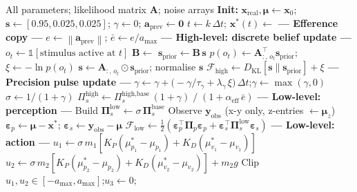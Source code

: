 \documentclass[11pt, a4paper]{article}
\newcommand{\vect}[1]{\bm{#1}}
\newcommand{\mat}[1]{\mathbf{#1}}
\newcommand{\FE}{\mathcal{F}}
\newcommand{\norm}[1]{\left\|#1\right\|}
\newcommand{\Pip}{\mat{\Pi}_p}
\newcommand{\Pisl}{\mat{\Pi}_s^{\text{low}}}
\newcommand{\Pish}{\Pi_s^{\text{high}}}
\newcommand{\epsp}{\vect{\varepsilon}_p}
\newcommand{\epss}{\vect{\varepsilon}_s}
\begin{document}
\begin{algorithm}[H]
\caption{Hierarchical AIF — Two-Tier Simulation Loop}
\label{alg:haif}
\begin{algorithmic}[1]
\Require All parameters; likelihood matrix $\mat{A}$; noise arrays
\State \textbf{Init:} $\vect{x}_{\text{real}}, \vect{\mu} \leftarrow \vect{x}_0$;\;
       $\vect{s} \leftarrow [0.95, 0.025, 0.025]$;\;
       $\gamma \leftarrow 0$;\;
       $\vect{a}_{\text{prev}} \leftarrow \vect{0}$
  \State $t \leftarrow k\,\Delta t$;\quad
         $\vect{x}^*(t) \leftarrow$ 
  \State
  \State \textbf{--- Efference copy ---}
  \State $e \leftarrow \norm{\vect{a}_{\text{prev}}}$;\quad
         $\bar{e} \leftarrow e / a_{\max}$
  \State
  \State \textbf{--- High-level: discrete belief update ---}
  \State $o_t \leftarrow \mathbb{1}[\text{stimulus active at }t]$
  \State $\mat{B} \leftarrow$ 
  \State $\vect{s}_{\text{prior}} \leftarrow \mat{B}\,\vect{s}$
  \State $p(o_t) \leftarrow \mat{A}_{:,\,o_t}^\top \vect{s}_{\text{prior}}$;\quad
         $\xi \leftarrow -\ln p(o_t)$
  \State $\vect{s} \leftarrow \mat{A}_{:,\,o_t} \odot \vect{s}_{\text{prior}}$;\quad
         normalise $\vect{s}$
  \State $\FE_{\text{high}} \leftarrow
         D_{\mathrm{KL}}[\vect{s}\|\vect{s}_{\text{prior}}] + \xi$
  \State
  \State \textbf{--- Precision pulse update ---}
  \State $\gamma \leftarrow \gamma + \bigl(-\gamma/\tau_\gamma
         + \lambda_\gamma\,\xi\bigr)\,\Delta t$;\quad $\gamma \leftarrow \max(\gamma,0)$
  \State $\sigma \leftarrow 1/(1+\gamma)$
         \hfill{}
  \State $\Pish \leftarrow \Pi_s^{\text{high,base}}\,(1+\gamma)
         \;/\;(1 + \alpha_{\text{eff}}\,\bar{e})$
         \hfill{}
  \State
  \State \textbf{--- Low-level: perception ---}
  \State Build $\Pisl \leftarrow \sigma\,\mat{\Pi}_s^{\text{base}}$
  \State Observe $\vect{y}_{\text{obs}}$ (x-y only, z-entries $\leftarrow \vect{\mu}_z$)
  \State $\epsp \leftarrow \vect{\mu} - \vect{x}^*$;\quad
         $\epss \leftarrow \vect{y}_{\text{obs}} - \vect{\mu}$
  \State $\FE_{\text{low}} \leftarrow \tfrac{1}{2}
         (\epsp^\top\Pip\epsp + \epss^\top\Pisl\epss)$
  \State
  \State \textbf{--- Low-level: action ---}
  \State $u_1 \leftarrow \sigma\,m_1[K_P(\mu_{p_1}^*-\mu_{p_1})
         + K_D(\mu_{v_1}^*-\mu_{v_1})]$
  \State $u_2 \leftarrow \sigma\,m_2[K_P(\mu_{p_2}^*-\mu_{p_2})
         + K_D(\mu_{v_2}^*-\mu_{v_2})] + m_2 g$
  \State Clip $u_1,u_2 \in [-a_{\max}, a_{\max}]$;\quad $u_3\leftarrow 0$;\quad

\end{algorithmic}
\end{algorithm}
\end{document}
